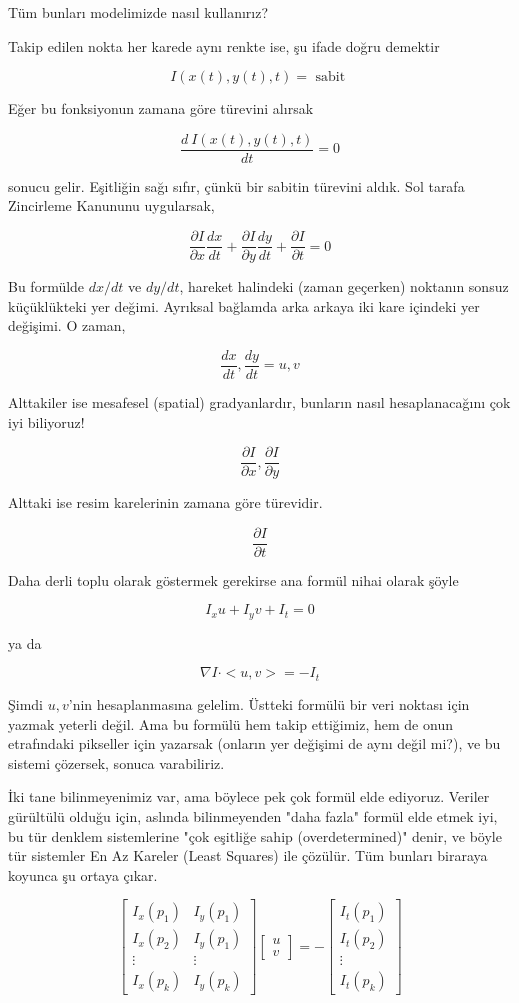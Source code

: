 \documentclass[12pt,fleqn]{article}\usepackage{../../common}
\begin{document}
Tüm bunları modelimizde nasıl kullanırız? 

Takip edilen nokta her karede aynı renkte ise, şu ifade doğru demektir 

$$ I(x(t),y(t),t) = \textrm{ sabit } $$

Eğer bu fonksiyonun zamana göre türevini alırsak

$$ \frac{d \ I(x(t),y(t),t)}{dt} = 0$$

sonucu gelir. Eşitliğin sağı sıfır, çünkü bir sabitin türevini aldık. Sol
tarafa Zincirleme Kanununu uygularsak, 

$$ \frac{\partial I}{\partial x}\frac{dx}{dt} +
\frac{\partial I}{\partial y}\frac{dy}{dt} +
\frac{\partial I}{\partial t} = 0
$$

Bu formülde $dx/dt$ ve $dy/dt$, hareket halindeki (zaman geçerken) noktanın
sonsuz küçüklükteki yer değimi. Ayrıksal bağlamda arka arkaya iki kare
içindeki yer değişimi. O zaman,

$$ \frac{dx}{dt}, \frac{dy}{dt} = u, v $$

Alttakiler ise mesafesel (spatial) gradyanlardır, bunların nasıl
hesaplanacağını çok iyi biliyoruz! 

$$ 
\frac{\partial I}{\partial x}, \frac{\partial I}{\partial y}
 $$

Alttaki ise resim karelerinin zamana göre türevidir.

$$ 
\frac{\partial I}{\partial t}
 $$

Daha derli toplu olarak göstermek gerekirse ana formül nihai olarak şöyle

$$ I_x u + I_y v + I_t = 0 $$

ya da

$$ 
\nabla I \cdot <u, v> = -I_t
 $$

Şimdi $u,v$'nin hesaplanmasına gelelim. Üstteki formülü bir veri noktası
için yazmak yeterli değil. Ama bu formülü hem takip ettiğimiz, hem de onun
etrafındaki pikseller için yazarsak (onların yer değişimi de aynı değil
mi?), ve bu sistemi çözersek, sonuca varabiliriz. 

İki tane bilinmeyenimiz var, ama böylece pek çok formül elde
ediyoruz. Veriler gürültülü olduğu için, aslında bilinmeyenden "daha
fazla" formül elde etmek iyi, bu tür denklem sistemlerine "çok eşitliğe
sahip (overdetermined)" denir, ve böyle tür sistemler En Az Kareler (Least
Squares) ile çözülür. Tüm bunları biraraya koyunca şu ortaya çıkar.

$$ 
\left[\begin{array}{cc}
I_x(p_1) & I_y(p_1) \\
I_x(p_2) & I_y(p_1) \\
\vdots & \vdots \\
I_x(p_k) & I_y(p_k) 
\end{array}\right]
\left[\begin{array}{r}
u \\
v
\end{array}\right] = 
-
\left[\begin{array}{c}
I_t(p_1) \\
I_t(p_2) \\
\vdots \\
I_t(p_k) 
\end{array}\right]
 $$
\end{document}
